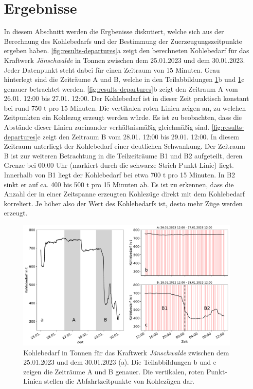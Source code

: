 \section{Ergebnisse}

In diesem Abschnitt werden die Ergbenisse diskutiert, welche sich aus der Berechnung des Kohlebedarfs und der Bestimmung der Zuerzeugungszeitpunkte ergeben haben. \autoref{fig:results-departures}a zeigt den berechneten Kohlebedarf für das Kraftwerk \emph{Jänschwalde} in Tonnen zwischen dem 25.01.2023 und dem 30.01.2023. Jeder Datenpunkt steht dabei für einen Zeitraum von 15 Minuten. Grau hinterlegt sind die Zeiträume A und B, welche in den Teilabbildungen \ref{fig:results-departures}b und \ref{fig:results-departures}c genauer betrachtet werden. \autoref{fig:results-departures}b zeigt den Zeitraum A vom 26.01. 12:00 bis 27.01. 12:00. Der Kohlebedarf ist in dieser Zeit praktisch konstant bei rund 750 t pro 15 Minuten. Die vertikalen roten Linien zeigen an, zu welchen Zeitpunkten ein Kohlezug erzeugt werden würde. Es ist zu beobachten, dass die Abstände dieser Linien zueinander verhältnismäßig gleichmäßig sind. \autoref{fig:results-departures}c zeigt den Zeitraum B vom 28.01. 12:00 bis 29.01. 12:00. In diesem Zeitraum unterliegt der Kohlebedarf einer deutlichen Schwankung. Der Zeitraum B ist zur weiteren Betrachtung in die Teilzeiträume B1 und B2 aufgeteilt, deren Grenze bei 00:00 Uhr (markiert durch die schwarze Strich-Punkt-Linie) liegt. Innerhalb von B1 liegt der Kohlebedarf bei etwa 700 t pro 15 Minuten. In B2 sinkt er auf ca. 400 bis 500 t pro 15 Minuten ab. Es ist zu erkennen, dass die Anzahl der in einer Zeitspanne erzeugten Kohlezüge direkt mit dem Kohlebedarf korreliert. Je höher also der Wert des Kohlebedarfs ist, desto mehr Züge werden erzeugt.

\begin{figure}[!ht]
	\centering
	\includegraphics[width=1.0\linewidth]{images/results/departures.pdf}
	\caption{Kohlebedarf in Tonnen für das Kraftwerk \emph{Jänschwalde} zwischen dem 25.01.2023 und dem 30.01.2023 (a). Die Teilabbildungen b und c zeigen die Zeiträume A und B genauer. Die vertikalen, roten Punkt-Linien stellen die Abfahrtzeitpunkte von Kohlezügen dar.}
	\label{fig:results-departures}
\end{figure}

